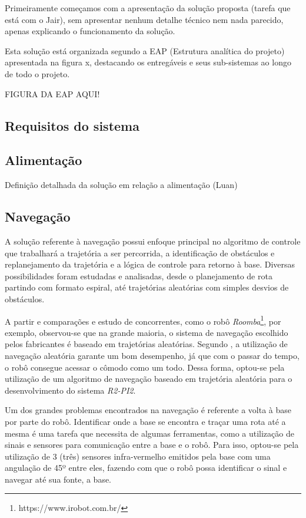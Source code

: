 Primeiramente começamos com a apresentação da solução proposta (tarefa que está com o Jair), sem apresentar nenhum detalhe técnico nem nada parecido, apenas explicando o funcionamento da solução. 

Esta solução está organizada segundo a EAP (Estrutura analítica do projeto) apresentada na figura x, destacando os entregáveis e seus sub-sistemas ao longo de todo o projeto.

FIGURA DA EAP AQUI!

\subsection{Requisitos do sistema} %
\label{sub:requisitos_do_sistema}

\subsection{Alimentação} %
\label{sub:alimentação}
	Definição detalhada da solução em relação a alimentação (Luan)

\subsection{Navegação} %
\label{sub:automação}
	A solução referente à navegação possui enfoque principal no algoritmo de controle que trabalhará a trajetória a ser percorrida, a identificação de obstáculos e replanejamento da trajetória e a lógica de controle para retorno à base. Diversas possibilidades foram estudadas e analisadas, desde o planejamento de rota partindo com formato espiral, até trajetórias aleatórias com simples desvios de obstáculos.

	A partir e comparações e estudo de concorrentes, como o robô \textit{Roomba}\footnote{https://www.irobot.com.br/}, por exemplo, observou-se que na grande maioria, o sistema de navegação escolhido pelos fabricantes é baseado em trajetórias aleatórias. Segundo \cite{robo_limpeza_domesti}, a utilização de navegação aleatória garante um bom desempenho, já que com o passar do tempo, o robô consegue acessar o cômodo como um todo. Dessa forma, optou-se pela utilização de um algoritmo de navegação baseado em trajetória aleatória para o desenvolvimento do sistema \textit{R2-PI2}.

	Um dos grandes problemas encontrados na navegação é referente a volta à base por parte do robô. Identificar onde a base se encontra e traçar uma rota até a mesma é uma tarefa que necessita de algumas ferramentas, como a utilização de sinais e sensores para comunicação entre a base e o robô. Para isso, optou-se pela utilização de 3 (três) sensores infra-vermelho emitidos pela base com uma angulação de 45º entre eles, fazendo com que o robô possa identificar o sinal e navegar até sua fonte, a base.

